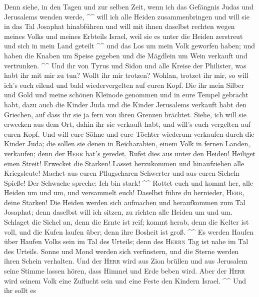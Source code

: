  Denn siehe, in den Tagen und zur selben Zeit, wenn ich
das Gefängnis Judas und Jerusalems wenden werde, \^{}\^{} 
will ich alle Heiden zusammenbringen und will sie in das Tal Josaphat
hinabführen und will mit ihnen daselbst rechten wegen meines Volks und
meines Erbteils Israel, weil sie es unter die Heiden zerstreut und sich
in mein Land geteilt \^{}\^{}  und das Los um mein Volk
geworfen haben; und haben die Knaben um Speise gegeben und die Mägdlein
um Wein verkauft und vertrunken. \^{}\^{}  Und ihr von
Tyrus und Sidon und alle Kreise der Philister, was habt ihr mit mir zu
tun? Wollt ihr mir trotzen? Wohlan, trotzet ihr mir, so will ich's euch
eilend und bald wiedervergelten auf euren Kopf.  Die ihr
mein Silber und Gold und meine schönen Kleinode genommen und in eure
Tempel gebracht habt,  dazu auch die Kinder Juda und die
Kinder Jerusalems verkauft habt den Griechen, auf dass ihr sie ja fern
von ihren Grenzen brächtet.  Siehe, ich will sie erwecken
aus dem Ort, dahin ihr sie verkauft habt, und will's euch vergelten auf
euren Kopf.  Und will eure Söhne und eure Töchter wiederum
verkaufen durch die Kinder Juda; die sollen sie denen in Reicharabien,
einem Volk in fernen Landen, verkaufen; denn der \textsc{Herr} hat's
geredet.  Rufet dies aus unter den Heiden! Heiliget einen
Streit! Erwecket die Starken! Lasset herzukommen und hinaufziehen alle
Kriegsleute!  Machet aus euren Pflugscharen Schwerter und
aus euren Sicheln Spieße! Der Schwache spreche: Ich bin stark! \^{}\^{}
 Rottet euch und kommt her, alle Heiden um und um, und
versammelt euch! Daselbst führe du hernieder, \textsc{Herr}, deine
Starken!  Die Heiden werden sich aufmachen und
heraufkommen zum Tal Josaphat; denn daselbst will ich sitzen, zu richten
alle Heiden um und um.  Schlaget die Sichel an, denn die
Ernte ist reif; kommt herab, denn die Kelter ist voll, und die Kufen
laufen über; denn ihre Bosheit ist groß. \^{}\^{}  Es
werden Haufen über Haufen Volks sein im Tal des Urteils; denn des
\textsc{Herrn} Tag ist nahe im Tal des Urteils.  Sonne
und Mond werden sich verfinstern, und die Sterne werden ihren Schein
verhalten.  Und der \textsc{Herr} wird aus Zion brüllen
und aus Jerusalem seine Stimme lassen hören, dass Himmel und Erde beben
wird. Aber der \textsc{Herr} wird seinem Volk eine Zuflucht sein und
eine Feste den Kindern Israel. \^{}\^{}  Und ihr sollt es
